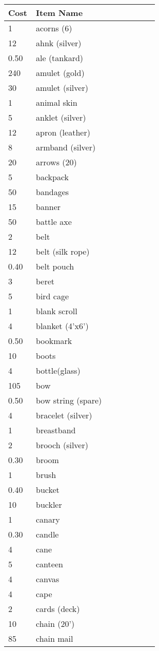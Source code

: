 \documentclass{article}
\begin{document}
\begin{longtable}{@{}p{0.18\linewidth} p{0.8\linewidth}}
\small
\textbf{Cost} & \textbf{Item Name}\\
\endhead
1 & acorns (6)\\
12 & ahnk (silver)\\
0.50 & ale (tankard)\\
240 & amulet (gold)\\
30 & amulet (silver)\\
1 & animal skin\\
5 & anklet (silver)\\
12 & apron (leather)\\
8 & armband (silver)\\
20 & arrows (20)\\
5 & backpack\\
50 & bandages\\
15 & banner\\
50 & battle axe\\
2 & belt\\
12 & belt (silk rope)\\
0.40 & belt pouch\\
3 & beret\\
5 & bird cage\\
1 & blank scroll\\
4 & blanket (4'x6')\\
0.50 & bookmark\\
10 & boots\\
4 & bottle(glass)\\
105 & bow\\
0.50 & bow string (spare)\\
4 & bracelet (silver)\\
1 & breastband\\
2 & brooch (silver)\\
0.30 & broom\\
1 & brush\\
0.40 & bucket\\
10 & buckler\\
1 & canary\\
0.30 & candle\\
4 & cane\\
5 & canteen\\
4 & canvas\\
4 & cape\\
2 & cards (deck)\\
10 & chain (20')\\
85 & chain mail\\

\end{longtable}
\end{document}
